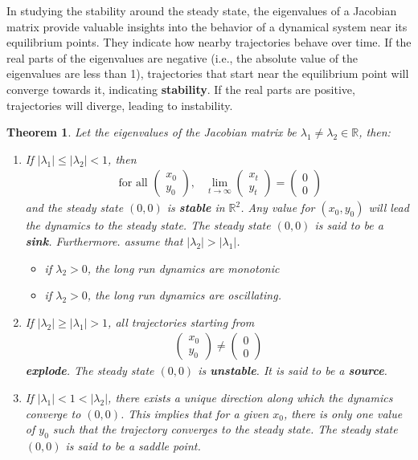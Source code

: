 \documentclass[11pt,a4paper]{book}
\newtheorem{theorem}{Theorem}[section]
\theoremstyle{definition}\newtheorem{definition}{Definition}
\theoremstyle{definition}\newtheorem{fact}{Fact}
\theoremstyle{definition}\newtheorem{remark}{Remark}
\theoremstyle{definition}\newtheorem{ex}{Ex.}
\theoremstyle{definition}\newtheorem{project}{Project}
\theoremstyle{definition}\newtheorem{problem}{Problem}
\theoremstyle{definition}\newtheorem{example}{Example}
\newenvironment{ftheorem}
{\begin{mdframed}\begin{theorem}}
		{\end{theorem}\end{mdframed}}
\numberwithin{theorem}{section}
\numberwithin{corollary}{chapter}
\numberwithin{assumption}{chapter}
\numberwithin{definition}{chapter}
\numberwithin{prop}{chapter}
\numberwithin{notation}{chapter}
\numberwithin{problem}{chapter}
\numberwithin{example}{chapter}
\numberwithin{fact}{chapter}
\numberwithin{ex}{chapter}
\def\R{\mathbb R}
\def\R{\mathbb R}
\begin{document}
	In studying the stability around the steady state, the eigenvalues of a Jacobian matrix provide valuable insights into the behavior of a dynamical system near its equilibrium points. They indicate how nearby trajectories behave over time. If the real parts of the eigenvalues are negative (i.e., the absolute value of the eigenvalues are less than 1), trajectories that start near the equilibrium point will converge towards it, indicating \textbf{stability}. If the real parts are positive, trajectories will diverge, leading to instability. 
	 
	\begin{ftheorem}
		Let the eigenvalues of the Jacobian matrix be $\lambda_1 \neq \lambda_2 \in \R$, then:
		\begin{enumerate}
			\item If $|\lambda_1| \leq |\lambda_2| < 1$, then
			\begin{align*}
				\text{ for all } 
				\begin{pmatrix}
						x_0 \\ y_0
				\end{pmatrix}, & \lim_{t\to\infty}  \begin{pmatrix}
				x_t \\ y_t
				\end{pmatrix} = 
				\begin{pmatrix}
				0 \\ 0
				\end{pmatrix}
			\end{align*}
			and the steady state $(0, 0)$ is \textbf{stable} in $\R^2$. Any value for $(x_0, y_0)$ will lead the
			dynamics to the steady state. The steady state $(0, 0)$ is said to be a \textbf{sink}. Furthermore. assume that $|\lambda_2| > |\lambda_1|$.
			\begin{itemize}
				\item if $\lambda_2 > 0$, the long run dynamics are monotonic
				\item if $\lambda_2 > 0$, the long run dynamics are oscillating.
			\end{itemize}
			\item If $|\lambda_2| \geq |\lambda_1| > 1$, all trajectories starting from
			\begin{align*}
				\begin{pmatrix}
					x_0 \\ y_0
				\end{pmatrix} \neq \begin{pmatrix}
				0 \\ 0
				\end{pmatrix}
			\end{align*}
			\textbf{explode}. The steady state $(0,0)$ is \textbf{unstable}. It is said to be a \textbf{source}.
			\item If $|\lambda_1| < 1 < |\lambda_2| $, there exists a unique direction along which the dynamics
			converge to $(0, 0)$. This implies that for a given $x_0$, there is only one value of $y_0$ such that the trajectory converges to the steady state. The steady state $(0, 0)$ is said to be a saddle point.
		\end{enumerate}
	\end{ftheorem}
	
\end{document}
